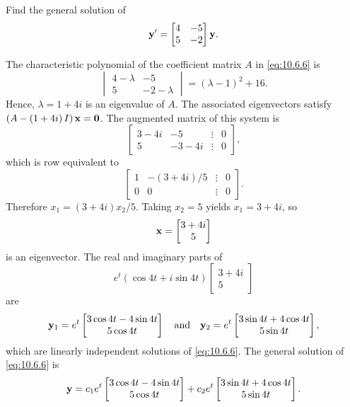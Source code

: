 \documentclass{ximera}
\begin{document}
\begin{example}\label{example:10.6.1}
 Find the general solution of
\begin{equation} \label{eq:10.6.6}
{\bf y}'=\begin{bmatrix}4&-5\\5&-2\end{bmatrix}{\bf y}.
\end{equation}

\begin{explanation} The characteristic polynomial of the coefficient matrix $A$
in \eqref{eq:10.6.6} is
$$
\begin{vmatrix} 4-\lambda&-5\\ 5&-2-\lambda
\end{vmatrix}=(\lambda-1)^2+16.
$$
Hence, $\lambda=1+4i$ is an eigenvalue of $A$. The associated
eigenvectors satisfy $\left(A-\left(1+4i\right)I\right){\bf x}={\bf
0}$. The augmented matrix of this system is
$$
\begin{bmatrix} 3-4i&-5&\vdots&0\\
5&-3-4i&\vdots&0  \end{bmatrix},
 $$
which is row equivalent to
$$
\begin{bmatrix} 1&-(3+4i)/5&\vdots&0\\ 0&0&\vdots&0
\end{bmatrix}.
$$
Therefore $x_1=(3+4i)x_2/5$. Taking $x_2=5$ yields $x_1=3+4i$, so
$$
{\bf x}=\begin{bmatrix}3+4i\\5\end{bmatrix}
$$
is an eigenvector.  The real and imaginary parts of
$$
e^t(\cos4t+i\sin4t)\begin{bmatrix}3+4i\\5\end{bmatrix}
$$
 are
$$
{\bf y}_1=e^t\begin{bmatrix}3\cos4t-4\sin
4t\\5\cos4t\end{bmatrix}\quad\mbox{and}\quad
{\bf y}_2=e^t\begin{bmatrix}3\sin4t+4\cos4t\\5\sin
4t\end{bmatrix},
$$
which are linearly independent solutions of  \eqref{eq:10.6.6}.
The general solution of \eqref{eq:10.6.6} is
$$
{\bf y}=
c_1e^t\begin{bmatrix}3\cos4t-4\sin
4t\\5\cos4t\end{bmatrix}+
c_2e^t\begin{bmatrix}3\sin4t+4\cos4t\\5\sin
4t\end{bmatrix}.
$$
\end{explanation}
\end{example}
\end{document}
